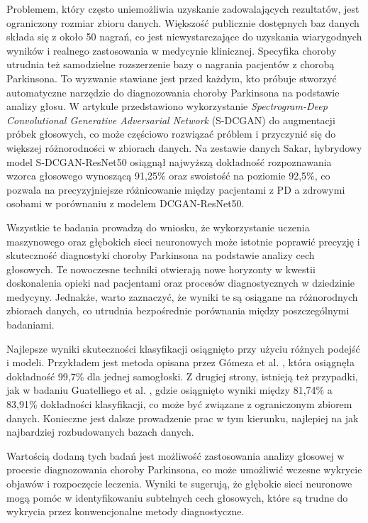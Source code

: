 Problemem, który często uniemożliwia uzyskanie zadowalających rezultatów, jest ograniczony rozmiar zbioru danych.
Większość publicznie dostępnych baz danych składa się z około 50 nagrań, co jest niewystarczające do uzyskania wiarygodnych wyników i
realnego zastosowania w medycynie klinicznej. Specyfika choroby utrudnia też samodzielne rozszerzenie bazy o nagrania pacjentów z chorobą Parkinsona.
To wyzwanie stawiane jest przed każdym, kto próbuje stworzyć automatyczne narzędzie do diagnozowania choroby Parkinsona na podstawie analizy głosu.
W artykule \cite{9257451} przedstawiono wykorzystanie \emph{Spectrogram-Deep Convolutional Generative Adversarial Network} (S-DCGAN) do
augmentacji próbek głosowych, co może częściowo rozwiązać próblem i przyczynić się do większej różnorodności w zbiorach danych.
Na zestawie danych Sakar, hybrydowy model S-DCGAN-ResNet50 osiągnął najwyższą dokładność rozpoznawania wzorca głosowego wynoszącą 91,25\%
oraz swoistość na poziomie 92,5\%, co pozwala na precyzyjniejsze różnicowanie między pacjentami z PD a zdrowymi osobami w porównaniu z modelem
DCGAN-ResNet50.

Wszystkie te badania prowadzą do wniosku, że wykorzystanie uczenia maszynowego oraz głębokich sieci neuronowych może istotnie poprawić precyzję
i skuteczność diagnostyki choroby Parkinsona na podstawie analizy cech głosowych.
Te nowoczesne techniki otwierają nowe horyzonty w kwestii doskonalenia opieki nad pacjentami oraz procesów diagnostycznych w dziedzinie medycyny.
Jednakże, warto zaznaczyć, że wyniki te są osiągane na różnorodnych zbiorach danych, co utrudnia bezpośrednie porównania między poszczególnymi badaniami.

Najlepsze wyniki skuteczności klasyfikacji osiągnięto przy użyciu różnych podejść i modeli.
Przykładem jest metoda opisana przez Gómeza et al. \cite{8999815}, która osiągnęła dokładność 99,7\% dla jednej samogłoski.
Z drugiej strony, istnieją też przypadki, jak w badaniu Guatelliego et al. \cite{GUATELLI2023106700}, gdzie osiągnięto wyniki między
81,74\% a 83,91\% dokładności klasyfikacji, co może być związane z ograniczonym zbiorem danych.
Konieczne jest dalsze prowadzenie prac w tym kierunku, najlepiej na jak najbardziej rozbudowanych bazach danych.

Wartością dodaną tych badań jest możliwość zastosowania analizy głosowej w procesie diagnozowania choroby Parkinsona, co może umożliwić
wczesne wykrycie objawów i rozpoczęcie leczenia. Wyniki te sugerują, że głębokie sieci neuronowe mogą pomóc w identyfikowaniu subtelnych cech
głosowych, które są trudne do wykrycia przez konwencjonalne metody diagnostyczne.


